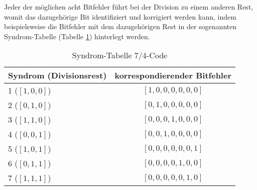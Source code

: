 Jeder der möglichen acht Bitfehler führt bei der Division zu einem anderen Rest,
womit das dazugehörige Bit identifiziert und korrigiert werden kann,
indem beispielsweise die Bitfehler mit dem dazugehörigen Rest in der sogenannten Syndrom-Tabelle (Tabelle \ref{mceliece:tab:syndrome}) hinterlegt werden.
\begin{table}
    \begin{center}
        \begin{tabular}{l|c}
            \hline
            Syndrom (Divisionsrest)     &korrespondierender Bitfehler\\
            \hline
            1 ($[1,0,0]$)               &$[1,0,0,0,0,0,0]$\\    
            2 ($[0,1,0]$)               &$[0,1,0,0,0,0,0]$\\    
            3 ($[1,1,0]$)               &$[0,0,0,1,0,0,0]$\\    
            4 ($[0,0,1]$)               &$[0,0,1,0,0,0,0]$\\    
            5 ($[1,0,1]$)               &$[0,0,0,0,0,0,1]$\\    
            6 ($[0,1,1]$)               &$[0,0,0,0,1,0,0]$\\    
            7 ($[1,1,1]$)               &$[0,0,0,0,0,1,0]$\\
            \hline

        \end{tabular}
    \end{center}
    \caption{\label{mceliece:tab:syndrome}Syndrom-Tabelle 7/4-Code}
\end{table}
